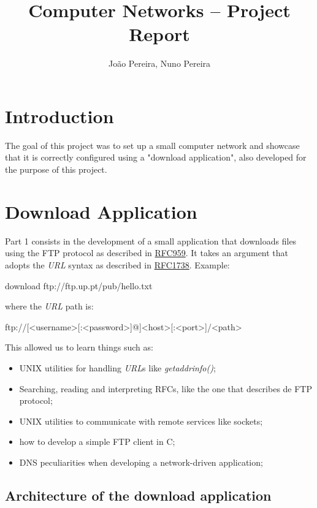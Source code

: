 \documentclass[11pt,a4paper,twocolumn]{article}
\title{Computer Networks -- \nth{2} Project Report}
\author{João Pereira, Nuno Pereira}
\begin{document}
\maketitle

\section{Introduction}

The goal of this project was to set up a small computer network and showcase that it is correctly configured using a "download application", also developed for the purpose of this project.

\section{Download Application}

Part 1 consists in the development of a small application that downloads files using the FTP protocol as described in \href{https://www.rfc-editor.org/rfc/rfc959}{RFC959}.
It takes an argument that adopts the \textit{URL} syntax as described in \href{https://www.rfc-editor.org/rfc/rfc1738}{RFC1738}. Example:

\begin{code-bash}
download ftp://ftp.up.pt/pub/hello.txt
\end{code-bash}

where the \textit{URL} path is:

\begin{code-bash}
ftp://[<username>[:<password>]@]<host>[:<port>]/<path>
\end{code-bash}

This allowed us to learn things such as:
\begin{itemize}
    \item UNIX utilities for handling \textit{URL}s like \textit{getaddrinfo()};
    \item Searching, reading and interpreting RFCs, like the one that describes de FTP protocol;
    \item UNIX utilities to communicate with remote services like sockets;
    \item how to develop a simple FTP client in C;
    \item DNS peculiarities when developing a network-driven application;
\end{itemize}

\subsection{Architecture of the download application}
\end{document}
